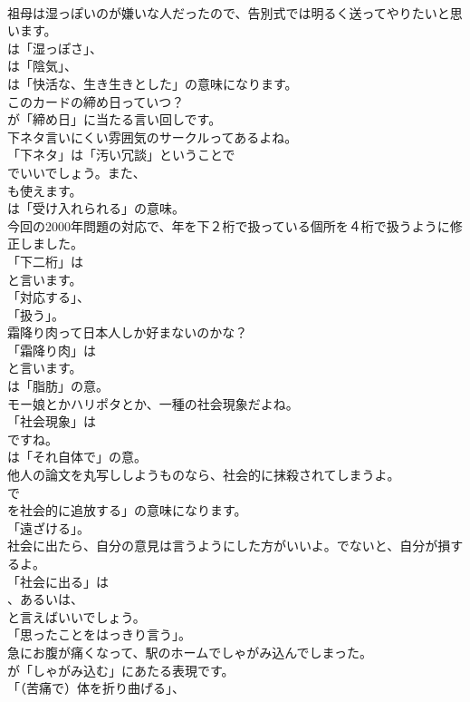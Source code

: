 \documentclass[8pt]{extreport}
\begin{document}
\begin{CJK}{UTF8}{min}
\\	祖母は湿っぽいのが嫌いな人だったので、告別式では明るく送ってやりたいと思います。 
\\	は「湿っぽさ」、
\\	は「陰気」、
\\	は「快活な、生き生きとした」の意味になります。	
\\	このカードの締め日っていつ？ 
\\	が「締め日」に当たる言い回しです。	
\\	下ネタ言いにくい雰囲気のサークルってあるよね。 
\\	「下ネタ」は「汚い冗談」ということで
\\	でいいでしょう。また、
\\	も使えます。
\\	は「受け入れられる」の意味。	
\\	今回の2000年問題の対応で、年を下２桁で扱っている個所を４桁で扱うように修正しました。 
\\	「下二桁」は
\\	と言います。
\\	「対応する」、
\\	「扱う」。	
\\	霜降り肉って日本人しか好まないのかな？ 
\\	「霜降り肉」は 
\\	と言います。
\\	は「脂肪」の意。	
\\	モー娘とかハリポタとか、一種の社会現象だよね。 
\\	「社会現象」は 
\\	ですね。
\\	は「それ自体で」の意。	
\\	他人の論文を丸写ししようものなら、社会的に抹殺されてしまうよ。 
\\	で
\\	を社会的に追放する」の意味になります。
\\	「遠ざける」。	
\\	社会に出たら、自分の意見は言うようにした方がいいよ。でないと、自分が損するよ。 
\\	「社会に出る」は
\\	、あるいは、
\\	と言えばいいでしょう。
\\	「思ったことをはっきり言う」。	
\\	急にお腹が痛くなって、駅のホームでしゃがみ込んでしまった。 
\\	が「しゃがみ込む」にあたる表現です。
\\	「（苦痛で）体を折り曲げる」、

\end{CJK}
\end{document}
